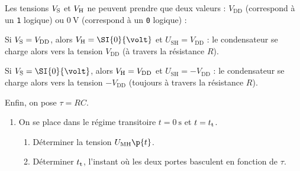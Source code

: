 \documentclass[a4paper,french,bookmarks]{article}
\begin{document}
    Les tensions $V_\text S$ et $V_\text H$ ne peuvent prendre que deux valeurs : $V_\text{DD}$ (correspond à un \texttt{1} logique) ou $\SI{0}{\volt}$ (correspond à un \texttt{0} logique) :
    \begin{enumerate}
        \itt Si $V_\text S = V_\text{DD}$, alors $V_\text H = \SI{0}{\volt}$ et $U_\text{SH} = V_\text{DD}$ : le condensateur se charge alors vers la tension $V_\text{DD}$ (à travers la résistance $R$).
        
        \itt Si $V_\text S = \SI{0}{\volt}$, alors $V_\text H = V_\text{DD}$ et $U_\text{SH} = -V_\text{DD}$ : le condensateur se charge alors vers la tension $-V_\text{DD}$ (toujours à travers la résistance $R$).
    \end{enumerate}
    Enfin, on pose $\tau = RC$.
    \begin{enumerate}
        \item On se place dans le régime transitoire $t = \SI{0}{\second}$ et $t = t_\text t$.
        \begin{enumerate}
            \item Déterminer la tension $U_\text{MH}\p{t}$.
            
            \noafter
            \nobefore\yesafter
            \yesbefore
            
            \item Déterminer $t_\text t$, l'instant où les deux portes basculent en fonction de $\tau$.
            

\end{enumerate}
\end{enumerate}
\end{document}
